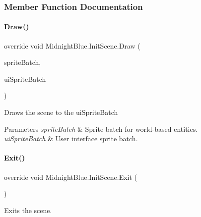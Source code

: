 \subsubsection{Member Function Documentation}
\hypertarget{class_midnight_blue_1_1_init_scene_a5d6b21ff45a6c14edcf0bd8318133725}{}\label{class_midnight_blue_1_1_init_scene_a5d6b21ff45a6c14edcf0bd8318133725} 
\paragraph{\texorpdfstring{Draw()}{Draw()}}
{\footnotesize\ttfamily override void Midnight\+Blue.\+Init\+Scene.\+Draw (\begin{DoxyParamCaption}\item[{Sprite\+Batch}]{sprite\+Batch,  }\item[{Sprite\+Batch}]{ui\+Sprite\+Batch }\end{DoxyParamCaption})\hspace{0.3cm}{\ttfamily [inline]}}



Draws the scene to the ui\+Sprite\+Batch 


\begin{DoxyParams}{Parameters}
{\em sprite\+Batch} & Sprite batch for world-\/based entities.\\
\hline
{\em ui\+Sprite\+Batch} & User interface sprite batch.\\
\hline
\end{DoxyParams}
\hypertarget{class_midnight_blue_1_1_init_scene_a16fc773b06a711e1ba35dda44e3edc3e}{}\label{class_midnight_blue_1_1_init_scene_a16fc773b06a711e1ba35dda44e3edc3e} 
\paragraph{\texorpdfstring{Exit()}{Exit()}}
{\footnotesize\ttfamily override void Midnight\+Blue.\+Init\+Scene.\+Exit (\begin{DoxyParamCaption}{ }\end{DoxyParamCaption})\hspace{0.3cm}{\ttfamily [inline]}}



Exits the scene. 

